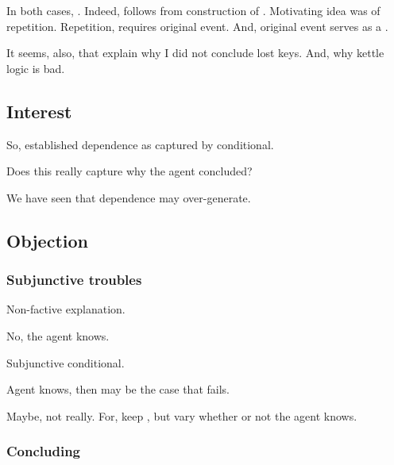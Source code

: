\begin{note}
  In both cases, \wit{}.
  Indeed, \wit{} follows from construction of .
  Motivating idea was of repetition.
  Repetition, requires original event.
  And, original event serves as a \wit{}.
\end{note}

\begin{note}
  It seems, also, that explain why I did not conclude lost keys.
  And, why kettle logic is bad.
\end{note}

\subsection{Interest}
\label{sec:interest}

\begin{note}
  So, established dependence as captured by conditional.

  Does this really capture why the agent concluded?

  We have seen that dependence may over-generate.
  
\end{note}


\subsection{Objection}
\label{sec:objection}

\subsubsection{Subjunctive troubles}
\label{sec:subjunctive-troubles}

\begin{note}
  Non-factive explanation.

  No, the agent knows.
\end{note}

\begin{note}
  Subjunctive conditional.

  Agent knows, then may be the case that \requ{} fails.

  Maybe, not really.
  For, keep \requ{}, but vary whether or not the agent knows.
\end{note}

\subsubsection{Concluding}
\label{sec:concluding}

